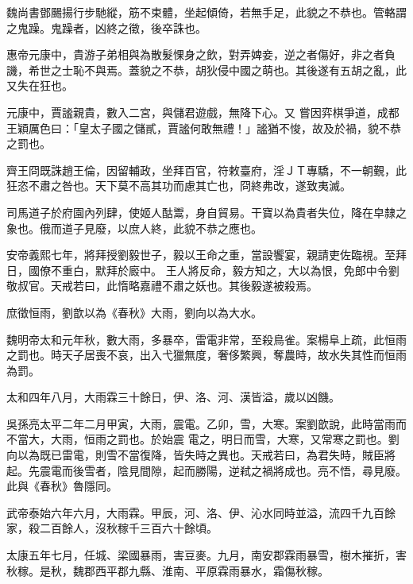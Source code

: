 \begin{pinyinscope}
 魏尚書鄧颺揚行步馳縱，筋不束體，坐起傾倚，若無手足，此貌之不恭也。管輅謂之鬼躁。鬼躁者，凶終之徵，後卒誅也。



 惠帝元康中，貴游子弟相與為散髮惈身之飲，對弄婢妾，逆之者傷好，非之者負譏，希世之士恥不與焉。蓋貌之不恭，胡狄侵中國之萌也。其後遂有五胡之亂，此又失在狂也。



 元康中，賈謐親貴，數入二宮，與儲君遊戲，無降下心。又
 嘗因弈棋爭道，成都王穎厲色曰：「皇太子國之儲貳，賈謐何敢無禮！」謐猶不悛，故及於禍，貌不恭之罰也。



 齊王冏既誅趙王倫，因留輔政，坐拜百官，符敕臺府，淫ＪＴ專驕，不一朝覲，此狂恣不肅之咎也。天下莫不高其功而慮其亡也，冏終弗改，遂致夷滅。



 司馬道子於府園內列肆，使姬人酤鬻，身自貿易。干寶以為貴者失位，降在皁隸之象也。俄而道子見廢，以庶人終，此貌不恭之應也。



 安帝義熙七年，將拜授劉毅世子，毅以王命之重，當設饗宴，親請吏佐臨視。至拜日，國僚不重白，默拜於廄中。
 王人將反命，毅方知之，大以為恨，免郎中令劉敬叔官。天戒若曰，此惰略嘉禮不肅之妖也。其後毅遂被殺焉。



 庶徵恒雨，劉歆以為《春秋》大雨，劉向以為大水。



 魏明帝太和元年秋，數大雨，多暴卒，雷電非常，至殺鳥雀。案楊阜上疏，此恒雨之罰也。時天子居喪不哀，出入弋獵無度，奢侈繁興，奪農時，故水失其性而恒雨為罰。



 太和四年八月，大雨霖三十餘日，伊、洛、河、漢皆溢，歲以凶饑。



 吳孫亮太平二年二月甲寅，大雨，震電。乙卯，雪，大寒。案劉歆說，此時當雨而不當大，大雨，恒雨之罰也。於始震
 電之，明日而雪，大寒，又常寒之罰也。劉向以為既已雷電，則雪不當復降，皆失時之異也。天戒若曰，為君失時，賊臣將起。先震電而後雪者，陰見間隙，起而勝陽，逆弒之禍將成也。亮不悟，尋見廢。此與《春秋》魯隱同。



 武帝泰始六年六月，大雨霖。甲辰，河、洛、伊、沁水同時並溢，流四千九百餘家，殺二百餘人，沒秋稼千三百六十餘頃。



 太康五年七月，任城、梁國暴雨，害豆麥。九月，南安郡霖雨暴雪，樹木摧折，害秋稼。是秋，魏郡西平郡九縣、淮南、平原霖雨暴水，霜傷秋稼。




\end{pinyinscope}
